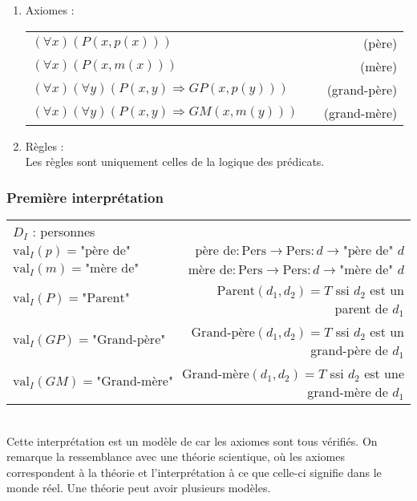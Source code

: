 {\begin{enumerate}
\item Axiomes :
\begin{center}
\begin{tabular}{lcr}
$(\forall x) \left(P(x,p(x))\right)$ & \hspace*{2cm}& (père)\\
$(\forall x) \left(P(x,m(x))\right)$ & \hspace*{2cm}& (mère)\\
$(\forall x)(\forall y) \left(P(x,y)\Rightarrow GP(x,p(y)) \right)$&& (grand-père)\\
$(\forall x)(\forall y) \left(P(x,y)\Rightarrow GM(x,m(y)) \right)$&& (grand-mère)\\
\end{tabular}
\end{center}
\vspace{\baselineskip}

\item Règles : \\
Les règles sont uniquement celles de la logique des prédicats.
\end{enumerate}

\subsubsection{Première interprétation}
\begin{tabular}{@{}llr}
$D_I$ : personnes&&\\
$\text{val}_I(p)=\text{"père de"}$ & &$\text{père de} : \text{Pers}\rightarrow\text{Pers} : d \rightarrow \text{"père de" }d$\\
$\text{val}_I(m)=\text{"mère de"}$ & &$\text{mère de} : \text{Pers}\rightarrow\text{Pers} : d \rightarrow \text{"mère de" }d$\\
$\text{val}_I(P)=\text{"Parent"}$ & &$\text{Parent}(d_1,d_2)=T$ ssi $d_2$ est un parent de $d_1$\\
$\text{val}_I(GP)=\text{"Grand-père"}$ & &$\text{Grand-père}(d_1,d_2)=T$ ssi $d_2$ est un grand-père de $d_1$\\
$\text{val}_I(GM)=\text{"Grand-mère"}$ & &$\text{Grand-mère}(d_1,d_2)=T$ ssi $d_2$ est une grand-mère de $d_1$\\
\end{tabular}\\

Cette interprétation est un modèle de  car les axiomes sont tous vérifiés.
On remarque la ressemblance avec une théorie scientique, où les axiomes correspondent à la théorie
et l'interprétation à ce que celle-ci signifie dans le monde réel.
Une théorie peut avoir plusieurs modèles.

}
